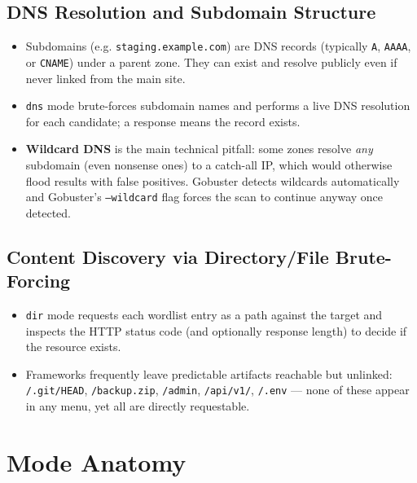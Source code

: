 \documentclass[11pt]{article}
\begin{document}
\subsection{DNS Resolution and Subdomain Structure}
\begin{itemize}
    \item Subdomains (e.g. \texttt{staging.example.com}) are DNS records (typically \texttt{A}, \texttt{AAAA}, or \texttt{CNAME}) under a parent zone. They can exist and resolve publicly even if never linked from the main site.
    \item \texttt{dns} mode brute-forces subdomain names and performs a live DNS resolution for each candidate; a response means the record exists.
    \item \textbf{Wildcard DNS} is the main technical pitfall: some zones resolve \emph{any} subdomain (even nonsense ones) to a catch-all IP, which would otherwise flood results with false positives. Gobuster detects wildcards automatically and Gobuster's \texttt{--wildcard} flag forces the scan to continue anyway once detected.
\end{itemize}

\subsection{Content Discovery via Directory/File Brute-Forcing}
\begin{itemize}
    \item \texttt{dir} mode requests each wordlist entry as a path against the target and inspects the HTTP status code (and optionally response length) to decide if the resource exists.
    \item Frameworks frequently leave predictable artifacts reachable but unlinked: \texttt{/.git/HEAD}, \texttt{/backup.zip}, \texttt{/admin}, \texttt{/api/v1/}, \texttt{/.env} --- none of these appear in any menu, yet all are directly requestable.
\end{itemize}


\section{Mode Anatomy}
\end{document}
